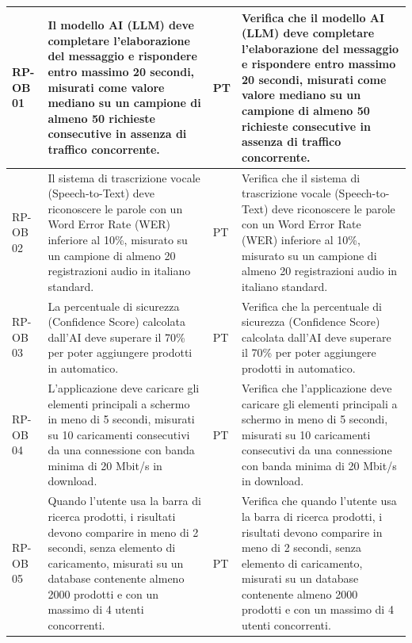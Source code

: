\documentclass[a4paper,11pt,oneside]{scrartcl}
\begin{document}
\begin{longtable}{|p{1.5cm}|p{5.5cm}|p{1.8cm}|p{5cm}|}
    RP-OB 01         & Il modello AI (LLM) deve completare l'elaborazione del messaggio e rispondere entro massimo 20 secondi, misurati come valore mediano su un campione di almeno 50 richieste consecutive in assenza di traffico concorrente.                                    & PT                 & Verifica che il modello AI (LLM) deve completare l'elaborazione del messaggio e rispondere entro massimo 20 secondi, misurati come valore mediano su un campione di almeno 50 richieste consecutive in assenza di traffico concorrente.                                    \\ \hline
    RP-OB 02         & Il sistema di trascrizione vocale (Speech-to-Text) deve riconoscere le parole con un Word Error Rate (WER) inferiore al 10\%, misurato su un campione di almeno 20 registrazioni audio in italiano standard.                                                  & PT                 & Verifica che il sistema di trascrizione vocale (Speech-to-Text) deve riconoscere le parole con un Word Error Rate (WER) inferiore al 10\%, misurato su un campione di almeno 20 registrazioni audio in italiano standard.                                                  \\ \hline
    RP-OB 03         & La percentuale di sicurezza (Confidence Score) calcolata dall'AI deve superare il 70\% per poter aggiungere prodotti in automatico.                                                                                                                           & PT                 & Verifica che la percentuale di sicurezza (Confidence Score) calcolata dall'AI deve superare il 70\% per poter aggiungere prodotti in automatico.                                                                                                                           \\ \hline
    RP-OB 04         & L'applicazione deve caricare gli elementi principali a schermo in meno di 5 secondi, misurati su 10 caricamenti consecutivi da una connessione con banda minima di 20 Mbit/s in download.                                                                     & PT                 & Verifica che l'applicazione deve caricare gli elementi principali a schermo in meno di 5 secondi, misurati su 10 caricamenti consecutivi da una connessione con banda minima di 20 Mbit/s in download.                                                                     \\ \hline
    RP-OB 05         & Quando l'utente usa la barra di ricerca prodotti, i risultati devono comparire in meno di 2 secondi, senza elemento di caricamento, misurati su un database contenente almeno 2000 prodotti e con un massimo di 4 utenti concorrenti.                         & PT                 & Verifica che quando l'utente usa la barra di ricerca prodotti, i risultati devono comparire in meno di 2 secondi, senza elemento di caricamento, misurati su un database contenente almeno 2000 prodotti e con un massimo di 4 utenti concorrenti.                         \\ \hline

\end{longtable}
\end{document}
